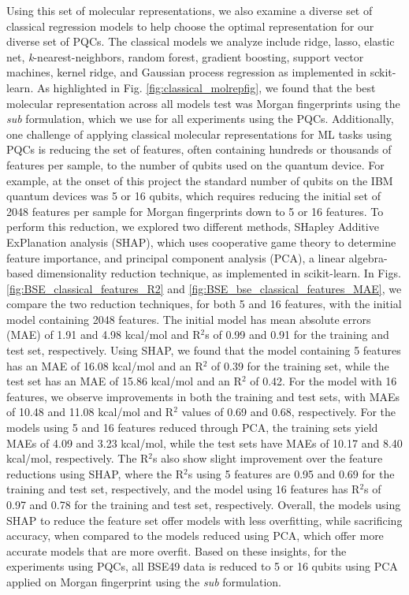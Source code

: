 \documentclass[journal=jacsat,manuscript=article]{achemso}
\begin{document}
Using this set of molecular representations, we also examine a diverse set of classical regression models to help choose the optimal representation for our diverse set of PQCs.
The classical models we analyze include ridge, lasso, elastic net, \textit{k}-nearest-neighbors, random forest, gradient boosting, support vector machines, kernel ridge, and Gaussian process regression as implemented in sckit-learn.\cite{pedregosa_scikit-learn_2011}
As highlighted in Fig. \ref{fig:classical_molrepfig}, we found that the best molecular representation across all models test was Morgan fingerprints using the \textit{sub} formulation, which we use for all experiments using the PQCs.
Additionally, one challenge of applying classical molecular representations for ML tasks using PQCs is reducing the set of features, often containing hundreds or thousands of features per sample, to the number of qubits used on the quantum device.
For example, at the onset of this project the standard number of qubits on the IBM quantum devices was 5 or 16 qubits, which requires reducing the initial set of 2048 features per sample for Morgan fingerprints down to 5 or 16 features.
To perform this reduction, we explored two different methods, SHapley Additive ExPlanation analysis (SHAP)\cite{lundberg_unified_2017}, which uses cooperative game theory to determine feature importance, and principal component analysis (PCA), a linear algebra-based dimensionality reduction technique, as implemented in scikit-learn.\cite{pedregosa_scikit-learn_2011}
In Figs. \ref{fig:BSE_classical_features_R2} and \ref{fig:BSE_bse_classical_features_MAE}, we compare the two reduction techniques, for both 5 and 16 features, with the initial model containing 2048 features.
The initial model has mean absolute errors (MAE) of 1.91 and 4.98 kcal/mol and R$^{2}$s of 0.99 and 0.91 for the training and test set, respectively.
Using SHAP, we found that the model containing 5 features has an MAE of 16.08 kcal/mol and an R$^{2}$ of 0.39 for the training set, while the test set has an MAE of 15.86 kcal/mol and an R$^{2}$ of 0.42.
For the model with 16 features, we observe improvements in both the training and test sets, with MAEs of 10.48 and 11.08 kcal/mol and R$^{2}$ values of 0.69 and 0.68, respectively.
For the models using 5 and 16 features reduced through PCA, the training sets yield MAEs of 4.09 and 3.23 kcal/mol, while the test sets have MAEs of 10.17 and 8.40 kcal/mol, respectively.
The R$^{2}$s also show slight improvement over the feature reductions using SHAP, where the R$^{2}$s using 5 features are 0.95 and 0.69 for the training and test set, respectively, and the model using 16 features has R$^{2}$s of 0.97 and 0.78 for the training and test set, respectively.
Overall, the models using SHAP to reduce the feature set offer models with less overfitting, while sacrificing accuracy, when compared to the models reduced using PCA, which offer more accurate models that are more overfit. 
Based on these insights, for the experiments using PQCs, all BSE49 data is reduced to 5 or 16 qubits using PCA applied on Morgan fingerprint using the \textit{sub} formulation.
\end{document}
